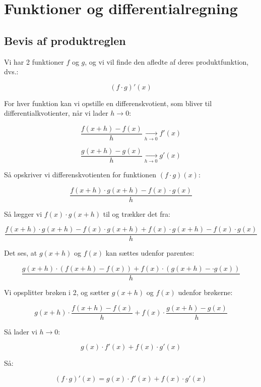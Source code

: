 \documentclass{article}
\makeatletter
\newenvironment{proofw}{\par
  \pushQED{\qed}%
  \normalfont \topsep6\p@\@plus6\p@\relax
  \trivlist
  \item[]\ignorespaces
}{%
  \popQED\endtrivlist\@endpefalse
}
\makeatother
\begin{document}
\section{Funktioner og differentialregning}

\subsection{Bevis af produktreglen}

\begin{proofw}
    

Vi har 2 funktioner $f$ og $g$, og vi vil finde den afledte af deres produktfunktion, dvs.:

$$
    (f\cdot g)'(x)
$$

For hver funktion kan vi opstille en differenskvotient, som bliver til differentialkvotienter, når vi lader $h \rightarrow 0$:

$$
    \frac{f(x+h)-f(x)}{h} \xrightarrow[h \rightarrow 0]{} f'(x)
$$

$$
    \frac{g(x+h)-g(x)}{h} \xrightarrow[h \rightarrow 0]{} g'(x)
$$

Så opskriver vi differenskvotienten for funktionen $(f \cdot g)(x)$:

$$
    \frac{
        f(x+h)\cdot g(x+h)
        -
        f(x) \cdot g(x)
    }{h}
$$

Så lægger vi $f(x) \cdot g(x+h)$ til og trækker det fra:

$$
    \frac{
        f(x+h)\cdot g(x+h)
        -
        f(x) \cdot g(x+h)
        +
        f(x) \cdot g(x+h)
        -
        f(x) \cdot g(x)
    }{h}
$$

Det ses, at $g(x+h)$ og $f(x)$ kan sættes udenfor parentes:

$$
    \frac{
        g(x+h) \cdot (f(x+h)
        -
        f(x))
        +
        f(x) \cdot (g(x+h)
        -
     \cdot g(x))
    }{h}
$$

Vi opsplitter brøken i 2, og sætter $g(x+h)$ og $f(x)$ udenfor brøkerne:

$$
    g(x+h) \cdot \frac{
          f(x+h)
        -
        f(x)   
    }{h}
    +
        f(x) \cdot 
        \frac{g(x+h)
        -
      g(x)}{h}
$$

Så lader vi $h \rightarrow 0$:

$$
    g(x) \cdot f'(x)+f(x) \cdot g'(x)
$$

Så:

$$
    (f \cdot g)'(x)=    g(x) \cdot f'(x)+f(x) \cdot g'(x)
$$

\end{proofw}
\end{document}
